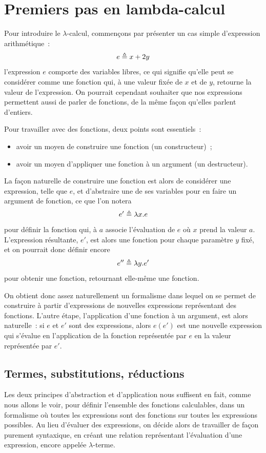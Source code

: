 \section{Premiers pas en lambda-calcul}

Pour introduire le $\lambda$-calcul, commençons par présenter un cas simple
d'expression arithmétique~:
\[e\triangleq x + 2y\]
l'expression $e$ comporte des variables libres, ce qui signifie qu'elle peut se
considérer comme une fonction qui, à une valeur fixée de $x$ et de $y$,
retourne la valeur de l'expression. On pourrait cependant souhaiter que nos
expressions permettent aussi de parler de fonctions, de la même façon qu'elles
parlent d'entiers.

Pour travailler avec des fonctions, deux points sont essentiels~:
\begin{itemize}
\item avoir un moyen de construire une fonction (un constructeur)~;
\item avoir un moyen d'appliquer une fonction à un argument (un destructeur).
\end{itemize}
La façon naturelle de construire une fonction est alors de considérer une
expression, telle que $e$, et d'abstraire une de ses variables pour en faire
un argument de fonction, ce que l'on notera
\[e' \triangleq \lambda x.e\]
pour définir la fonction qui, à $a$ associe l'évaluation de $e$ où $x$ prend la
valeur $a$. L'expression résultante, $e'$, est alors une fonction pour chaque
paramètre $y$ fixé, et on pourrait donc définir encore
\[e'' \triangleq \lambda y.e'\]
pour obtenir une fonction, retournant elle-même une fonction.

On obtient donc assez naturellement un formalisme dans lequel on se permet de
construire à partir d'expressions de nouvelles expressions représentant des
fonctions. L'autre étape, l'application d'une fonction à un argument, est alors
naturelle~: si $e$ et $e'$ sont des expressions, alors $e(e')$ est une nouvelle
expression qui s'évalue en l'application de la fonction représentée par $e$
en la valeur représentée par $e'$.

\subsection{Termes, substitutions, réductions}

Les deux principes d'abstraction et d'application nous suffisent en fait, comme
nous allons le voir, pour définir l'ensemble des fonctions calculables, dans
un formalisme où toutes les expressions sont des fonctions sur toutes les
expressions possibles. Au lieu d'évaluer des expressions, on décide alors de
travailler de façon purement syntaxique, en créant une relation représentant
l'évaluation d'une expression, encore appelée $\lambda$-terme.

